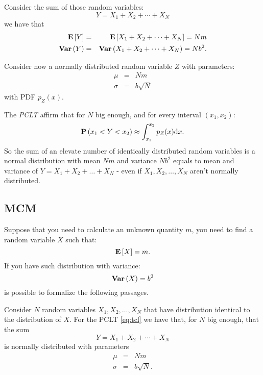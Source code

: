 \documentclass[dissertation.tex]{subfiles}
\begin{document}
Consider the sum of those random variables:
\begin{equation*}
  Y = X_1+X_2+\cdots+X_N
\end{equation*}
we have that
\begin{eqnarray*}
  \mathrm{\textbf{E}}\left[Y\right]&=&\mathrm{\textbf{E}}\left[X_1+X_2+\cdots+X_N\right]=Nm\\
  \mathrm{\textbf{Var}}\left(Y\right)&=&\mathrm{\textbf{Var}}\left(X_1+X_2+\cdots+X_N\right)=Nb^2.
\end{eqnarray*}

Consider now a normally distributed random variable $Z$ with
parameters:
\begin{eqnarray*}
  \mu&=&Nm\\
  \sigma&=&b\sqrt{N}
\end{eqnarray*}
with \ac{PDF} $p_Z(x)$.

The \emph{\ac{PCLT}} affirm that for $N$ big
enough, and for every interval $(x_1,x_2)$:
\begin{equation}\label{eq:tcl}
  \mathrm{\textbf{P}}\left(x_1<Y<x_2\right)\approx\int_{x_1}^{x_2}p_Z(x) \mathrm{d} x.
\end{equation}
So the sum of an elevate number of identically distributed random
variables is a normal distribution with mean $Nm$ and variance $Nb^2$
equals to mean and variance of $Y=X_1+X_2+\dots+X_N$ - even if
$X_1,X_2,\dots,X_N$ aren't normally distributed.

\subsection{\acf{MCM}}
Suppose that you need to calculate an unknown quantity $m$, you need
to find a random variable $X$ such that:
\begin{equation*}
  \mathrm{\textbf{E}}\left[X\right] = m.
\end{equation*}
If you have such distribution with variance:
\begin{equation*}
  \mathrm{\textbf{Var}}\left(X\right) = b^2
\end{equation*}
is possible to formalize the following passages.

Consider $N$ random variables $X_1,X_2,\dots,X_N$ that have
distribution identical to the distribution of $X$. For the \ac{PCLT}
\cref{eq:tcl} we have that, for $N$ big enough, that the sum
\begin{equation*}
  Y=X_1+X_2+\cdots+X_N
\end{equation*}
is normally distributed with parameters
\begin{eqnarray*}
  \mu &=& Nm\\
  \sigma&=&b\sqrt{N}.
\end{eqnarray*}
\end{document}
